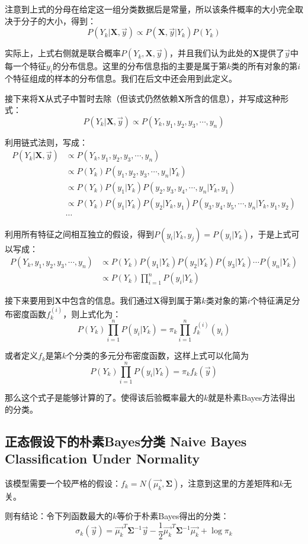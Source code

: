 \documentclass{MGLSA-cn-book-math}
\begin{document}
注意到上式的分母在给定这一组分类数据后是常量，所以该条件概率的大小完全取决于分子的大小，得到：
\[
	P(Y_k|\bm{X}, \vec{y})\propto P(\bm{X}, \vec{y}|Y_k)P(Y_k)
\]

实际上，上式右侧就是联合概率$P(Y_k, \bm{X}, \vec{y})$，并且我们认为此处的$\bm{X}$提供了$\vec{y}$中每一个特征$y_i$的分布信息。这里的分布信息指的主要是属于第$k$类的所有对象的第$i$个特征组成的样本的分布信息。我们在后文中还会用到此定义。

接下来将$\bm{X}$从式子中暂时去除（但该式仍然依赖$\bm{X}$所含的信息），并写成这种形式：
\[
	P(Y_k|\bm{X}, \vec{y})\propto P(Y_k, y_1, y_2, y_3, \cdots, y_n)
\]

利用链式法则，写成：
\begin{align*}
	P(Y_k|\bm{X}, \vec{y})&\propto P(Y_k, y_1, y_2, y_3, \cdots, y_n) \\
	&\propto P(Y_k)P(y_1, y_2, y_3, \cdots, y_n|Y_k) \\
	&\propto P(Y_k)P(y_1|Y_k)P(y_2, y_3, y_4, \cdots, y_n|Y_k, y_1) \\
	&\propto P(Y_k)P(y_1|Y_k)P(y_2|Y_k,y_1)P(y_3, y_4, y_5, \cdots, y_n|Y_k, y_1, y_2) \\
	&\cdots
\end{align*}

利用所有特征之间相互独立的假设，得到$P(y_i|Y_k,y_j)=P(y_i|Y_k)$，于是上式可以写成：
\begin{align*}
	P(Y_k, y_1, y_2, y_3, \cdots, y_n)&\propto P(Y_k)P(y_1|Y_k)P(y_2|Y_k)P(y_3|Y_k)\cdots P(y_n|Y_k) \\
	&\propto P(Y_k)\prod_{i=1}^nP(y_i|Y_k)
\end{align*}

接下来要用到$\bm{X}$中包含的信息。我们通过$\bm{X}$得到属于第$k$类对象的第$i$个特征满足分布密度函数$f_k^{(i)}$，则上式化为：
\[
	P(Y_k)\prod_{i=1}^nP(y_i|Y_k)=\pi_k\prod_{i=1}^nf_k^{(i)}(y_i)
\]

或者定义$f_k$是第$k$个分类的多元分布密度函数，这样上式可以化简为
\[
	P(Y_k)\prod_{i=1}^nP(y_i|Y_k)=\pi_k f_k(\vec{y})
\]

那么这个式子是能够计算的了。使得该后验概率最大的$k$就是朴素Bayes方法得出的分类。
\subsection{正态假设下的朴素Bayes分类 Naive Bayes Classification Under Normality}
该模型需要一个较严格的假设：$f_k=N(\vec{\mu_k}, \bm{\Sigma})$，注意到这里的方差矩阵和$k$无关。

则有结论：令下列函数最大的$k$等价于朴素Bayes得出的分类：
\[
	\sigma_k(\vec{y})=\vec{\mu_k}^T\bm{\Sigma}^{-1}\vec{y}-\frac{1}{2}\vec{\mu_k}^T\bm{\Sigma}^{-1}\vec{\mu_k}+\log\pi_k
\]
\end{document}
